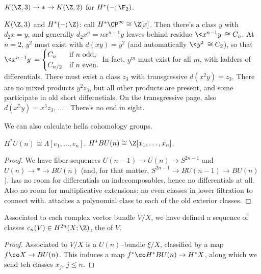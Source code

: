 \begin{example}
$K(\Z, 3) \to * \to K(\Z, 2)$ for $H^*(-; \F_2)$.
\end{example}

\begin{example}
$K(\Z, 3)$ and $H^*(-; \Z)$: call $H^*\CP^\infty \cong \Z[x]$.  Then there's a class $y$ with $d_2 x = y$, and generally $d_2 x^n = n x^{n-1} y$ leaves behind residue $\<x^{n-1} y\> \cong C_n$.  At $n = 2$, $y^2$ must exist with $d(xy) = y^2$ (and automatically $\<y^2\> \cong C_2$), so that $\<x^{n-1} y\> = \begin{cases} C_n & \text{if $n$ odd}, \\ C_{n/2} & \text{if $n$ even}.\end{cases}$  In fact, $y^m$ must exist for all $m$, with ladders of differentials.  There must exist a class $z_3$ with transgressive $d(x^2 y) = z_3$.  There are no mixed products $y^2 z_3$, but all other products are present, and some participate in old short differnetials.  On the transgressive page, also $d(x^5 y) = x^3 z_3$, ... . There's no end in sight.
\end{example}

We can also calculate hella cohomology groups.

\begin{theorem}
$H^* U(n) \cong \Lambda[e_1, \ldots, e_n]$.  $H^* BU(n) \cong \Z[x_1, \ldots, x_n]$.
\end{theorem}
\begin{proof}
We have fiber sequences $U(n-1) \to U(n) \to S^{2n-1}$ and $U(n) \to * \to BU(n)$ (and, for that matter, $S^{2n-1} \to BU(n-1) \to BU(n)$).   has no room for differentials on indecomposables, hence no differentials at all.  Also no room for multiplicative extensions: no even classes in lower filtration to connect with.   attaches a polynomial class to each of the old exterior classes.
\end{proof}

\begin{corollary}
Associated to each complex vector bundle $V / X$, we have defined a sequence of classes $c_n(V) \in H^{2n}(X; \Z)$, the  of $V$.
\end{corollary}
\begin{proof}
Associated to $V/X$ is a $U(n)$--bundle $\xi / X$, classified by a map $f\co X \to BU(n)$.  This induces a map $f^*\co H^* BU(n) \to H^* X$, along which we send teh classes $x_j$, $j \le n$.
\end{proof}




